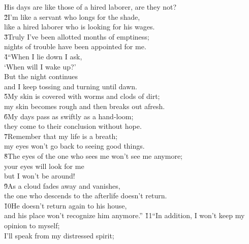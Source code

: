 \begin{poetry}
\poemll    His days are like those of a hired laborer, are they not? \\
\poeml \v{2}I'm like a servant who longs for the shade, \\
\poemll    like a hired laborer who is looking for his wages. \\
\poeml \v{3}Truly I've been allotted months of emptiness; \\
\poemll    nights of trouble have been appointed for me. \\
\poeml \v{4}``When I lie down I ask, \\
\poemll    `When will I wake up?' \\
\poeml But the night continues \\
\poemll    and I keep tossing and turning until dawn. \\
\poeml \v{5}My skin is covered with worms and clods of dirt; \\
\poemll    my skin becomes rough and then breaks out afresh. \\
\poeml \v{6}My days pass as swiftly as a hand-loom; \\
\poemll    they come to their conclusion without hope. \\
\poeml \v{7}Remember that my life is a breath; \\
\poemll    my eyes won't go back to seeing good things. \\
\poeml \v{8}The eyes of the one who sees me won't see me anymore; \\
\poemll    your eyes will look for me \\
\poemlll       but I won't be around! \\
\poeml \v{9}As a cloud fades away and vanishes, \\
\poemll    the one who descends to the afterlife doesn't return. \\
\poeml \v{10}He doesn't return again to his house, \\
\poemll    and his place won't recognize him anymore.''
\poeml \v{11}``In addition, I won't keep my opinion to myself; \\
\poemll    I'll speak from my distressed spirit; \\

\end{poetry}
